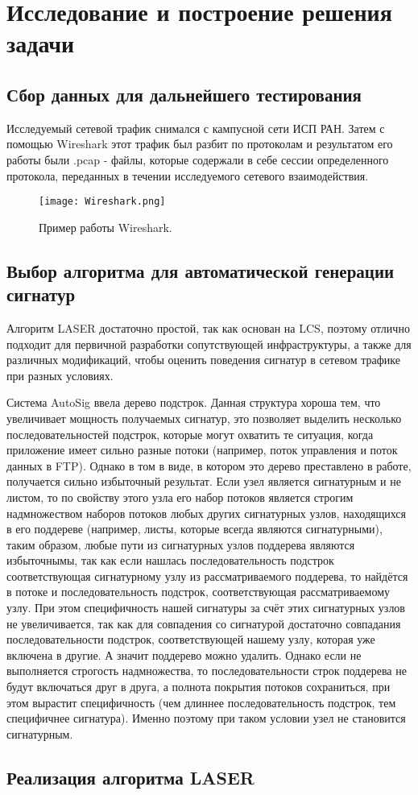 \section{Исследование и построение решения задачи}
\label{sec:Section3} 

\subsection{Сбор данных для дальнейшего тестирования}


Исследуемый сетевой трафик снимался с кампусной сети ИСП РАН. Затем с помощью Wireshark \cite{Wireshark} этот трафик был разбит по протоколам и результатом его работы были .pcap - файлы,
которые содержали в себе сессии определенного протокола, переданных в течении исследуемого сетевого взаимодействия.

\begin{figure}[H]
    \begin{center}
        \texttt{[image: Wireshark.png]}
        \caption{Пример работы Wireshark.}
    \end{center}
\end{figure}

\subsection{Выбор алгоритма для автоматической генерации сигнатур}
Алгоритм LASER достаточно простой, так как основан на LCS, поэтому отлично подходит для первичной разработки сопутствующей инфраструктуры,
а также для различных модификаций, чтобы оценить поведения сигнатур в сетевом трафике при разных условиях.


Система AutoSig ввела дерево подстрок.
Данная структура хороша тем, что увеличивает мощность получаемых сигнатур,
это позволяет выделить несколько последовательностей подстрок, которые могут охватить те ситуация, когда
приложение имеет сильно разные потоки (например, поток управления и поток данных в FTP).
Однако в том в виде, в котором это дерево преставлено в работе, получается сильно избыточный результат.
Если узел является сигнатурным и не листом, то по свойству этого узла его набор потоков является строгим надмножеством
наборов потоков любых других сигнатурных узлов, находящихся в его поддереве (например, листы, которые всегда являются сигнатурными),
таким образом, любые пути из сигнатурных узлов поддерева являются избыточнымы, так как если нашлась последовательность подстрок
соответствующая сигнатурному узлу из рассматриваемого поддерева, то найдётся в потоке и последовательность подстрок, соответствующая рассматриваемому узлу.
При этом специфичность нашей сигнатуры за счёт этих сигнатурных узлов не увеличивается,
так как для совпадения со сигнатурой достаточно совпадания последовательности подстрок, соответствующей нашему узлу, которая уже включена в другие.
А значит поддерево можно удалить. Однако если не выполняется строгость надмножества, то последовательности строк
поддерева не будут включаться друг в друга, а полнота покрытия потоков сохраниться,
при этом вырастит специфичность (чем длиннее последовательность подстрок, тем специфичнее сигнатура).
Именно поэтому при таком условии узел не становится сигнатурным.

\subsection{Реализация алгоритма LASER}



\newpage
